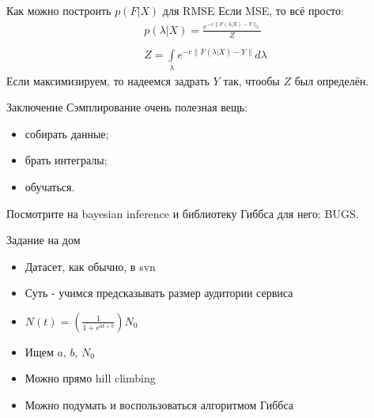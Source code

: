 \documentclass[14pt, fleqn, xcolor={dvipsnames, table}]{beamer}
\begin{document}
\begin{frame}{Как можно построить $p(F|X)$ для RMSE}
Если MSE, то всё просто:
$$\begin{array}{l}
p(\lambda|X) = \frac{e^{-c\|F(\lambda|X) - Y\|_2}}{Z} \\
\\
Z = \int\limits_{\lambda} e^{-c\|F(\lambda|X) - Y\|}d\lambda
\end{array}$$
Если максимизируем, то надеемся задрать $Y$ так, чтообы $Z$ был определён. 
\end{frame}

\begin{frame}{Заключение}
Сэмплирование очень полезная вещь:
\begin{itemize}
  \item собирать данные;
  \item брать интегралы;
  \item обучаться.
\end{itemize}
Посмотрите на bayesian inference и библиотеку Гиббса для него: BUGS.
\end{frame}

\begin{frame}{Задание на дом}
\begin{itemize}
  \item Датасет, как обычно, в svn
  \item Суть - учимся предсказывать размер аудитории сервиса
  \item $N(t) = (\frac{1}{1 + e^{at+b}})N_0$
  \item Ищем $a$, $b$, $N_0$
  \item Можно прямо hill climbing
  \item Можно подумать и воспользоваться алгоритмом Гиббса 
\end{itemize}
\end{frame}
\end{document}
